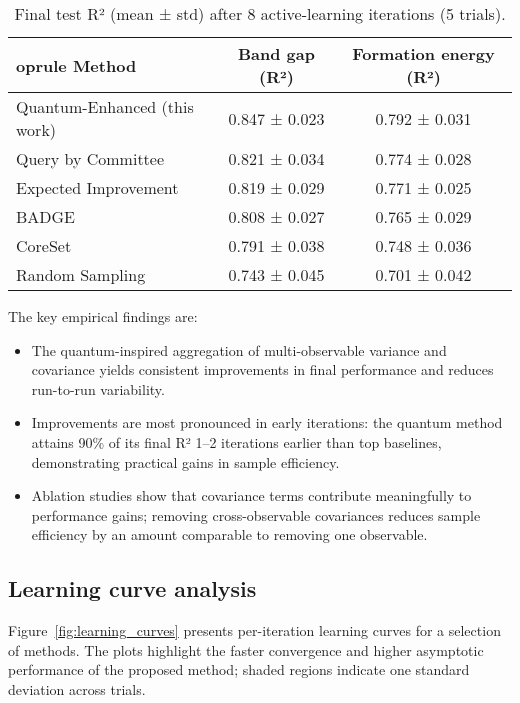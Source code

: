 \documentclass{article}
\begin{document}
\begin{table}[t]
\centering
\caption{Final test R² (mean ± std) after 8 active-learning iterations (5 trials).}
\label{tab:overall_results}
\begin{tabular}{lcc}
	oprule
Method & Band gap (R²) & Formation energy (R²) \\
\midrule
Quantum-Enhanced (this work) & 0.847 ± 0.023 & 0.792 ± 0.031 \\
Query by Committee & 0.821 ± 0.034 & 0.774 ± 0.028 \\
Expected Improvement & 0.819 ± 0.029 & 0.771 ± 0.025 \\
BADGE & 0.808 ± 0.027 & 0.765 ± 0.029 \\
CoreSet & 0.791 ± 0.038 & 0.748 ± 0.036 \\
Random Sampling & 0.743 ± 0.045 & 0.701 ± 0.042 \\
\bottomrule
\end{tabular}
\end{table}

The key empirical findings are:
\begin{itemize}
    \item The quantum-inspired aggregation of multi-observable variance and covariance yields consistent improvements in final performance and reduces run-to-run variability.
    \item Improvements are most pronounced in early iterations: the quantum method attains 90\% of its final R² 1–2 iterations earlier than top baselines, demonstrating practical gains in sample efficiency.
    \item Ablation studies show that covariance terms contribute meaningfully to performance gains; removing cross-observable covariances reduces sample efficiency by an amount comparable to removing one observable.
\end{itemize}

\subsection{Learning curve analysis}

Figure~\ref{fig:learning_curves} presents per-iteration learning curves for a selection of methods. The plots highlight the faster convergence and higher asymptotic performance of the proposed method; shaded regions indicate one standard deviation across trials.
\end{document}
